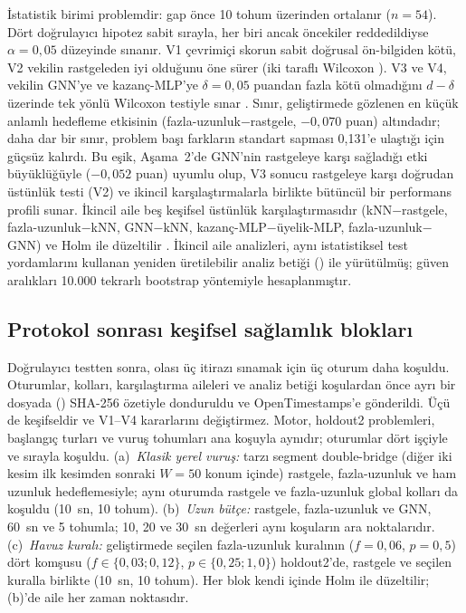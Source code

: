 İstatistik birimi problemdir: gap önce 10 tohum üzerinden ortalanır ($n=54$). Dört doğrulayıcı
hipotez sabit sırayla, her biri ancak öncekiler reddedildiyse $\alpha=0{,}05$ düzeyinde sınanır.
V1 çevrimiçi skorun sabit doğrusal ön-bilgiden kötü, V2 vekilin rastgeleden iyi olduğunu öne sürer
(iki taraflı Wilcoxon \citep{wilcoxon_1945}). V3 ve V4, vekilin GNN'ye ve kazanç-MLP'ye
$\delta=0{,}05$ puandan fazla kötü olmadığını $d-\delta$ üzerinde tek yönlü Wilcoxon testiyle sınar
\citep{schuirmann_1987_tost, lakens_2017_equivalence}.
Sınır, geliştirmede gözlenen en küçük anlamlı hedefleme etkisinin (fazla-uzunluk$-$rastgele,
$-0{,}070$ puan) altındadır; daha dar bir sınır, problem başı farkların standart sapması 0,131'e
ulaştığı için güçsüz kalırdı.
Bu eşik, Aşama~2'de GNN'nin rastgeleye karşı sağladığı etki büyüklüğüyle ($-0{,}052$ puan)
uyumlu olup, V3 sonucu rastgeleye karşı doğrudan üstünlük testi (V2) ve ikincil karşılaştırmalarla
birlikte bütüncül bir performans profili sunar.
İkincil aile beş keşifsel üstünlük karşılaştırmasıdır (kNN$-$rastgele, fazla-uzunluk$-$kNN,
GNN$-$kNN, kazanç-MLP$-$üyelik-MLP, fazla-uzunluk$-$GNN) ve Holm ile düzeltilir \citep{holm_1979}.
İkincil aile analizleri, aynı istatistiksel test yordamlarını kullanan yeniden üretilebilir analiz
betiği () ile yürütülmüş; güven aralıkları 10.000 tekrarlı bootstrap yöntemiyle
hesaplanmıştır.

\subsection{Protokol sonrası keşifsel sağlamlık blokları}\label{sec:deney-saglamlik}

Doğrulayıcı testten sonra, olası üç itirazı sınamak için üç oturum daha koşuldu. Oturumlar, kolları,
karşılaştırma aileleri ve analiz betiği koşulardan önce ayrı bir dosyada
() SHA-256 özetiyle donduruldu ve OpenTimestamps'e gönderildi.
Üçü de keşifseldir ve V1--V4 kararlarını değiştirmez. Motor, holdout2 problemleri, başlangıç turları
ve vuruş tohumları ana koşuyla aynıdır; oturumlar dört işçiyle ve sırayla koşuldu.
(a)~\emph{Klasik yerel vuruş:} \citet{applegate_2003_clk} tarzı segment double-bridge (diğer iki
kesim ilk kesimden sonraki $W=50$ konum içinde) rastgele, fazla-uzunluk ve ham uzunluk hedeflemesiyle;
aynı oturumda rastgele ve fazla-uzunluk global kolları da koşuldu (10~sn, 10 tohum).
(b)~\emph{Uzun bütçe:} rastgele, fazla-uzunluk ve GNN, 60~sn ve 5 tohumla; 10, 20 ve 30~sn
değerleri aynı koşuların ara noktalarıdır.
(c)~\emph{Havuz kuralı:} geliştirmede seçilen fazla-uzunluk kuralının ($f=0{,}06$, $p=0{,}5$) dört
komşusu ($f\in\{0{,}03;0{,}12\}$, $p\in\{0{,}25;1{,}0\}$) holdout2'de, rastgele ve seçilen kuralla
birlikte (10~sn, 10 tohum).
Her blok kendi içinde Holm ile düzeltilir; (b)'de aile her zaman noktasıdır.

